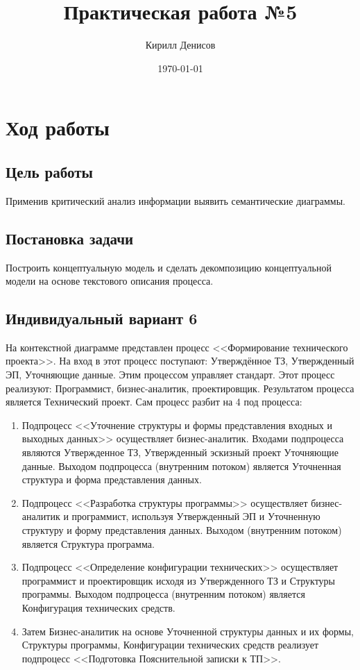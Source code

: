 \documentclass[a4paper,14pt]{extarticle}
\author{Кирилл Денисов}
\title{Практическая работа №5}
\date{\today}
\newcommand{\pathToCommonFolder}{/home/denilai/Documents/repos/latex/Common}
\begin{document}
	\thispagestyle{empty}
	
	\newpage
	\newpage
	\section*{Ход работы}
	
	
	\subsection*{Цель работы}
	Применив критический анализ информации выявить семантические диаграммы.
	
	\subsection*{Постановка задачи}
	Построить концептуальную модель и сделать декомпозицию концептуальной модели на основе текстового описания процесса.

	\subsection*{Индивидуальный вариант 6}
	На контекстной диаграмме представлен процесс <<Формирование технического проекта>>. На вход в этот процесс поступают: Утверждённое ТЗ, Утвержденный ЭП, Уточняющие данные. Этим процессом управляет стандарт. Этот процесс реализуют: Программист, бизнес-аналитик, проектировщик. Результатом процесса является Технический проект.
	Сам процесс разбит на 4 под процесса:
	\begin{enumerate}
	\item Подпроцесс <<Уточнение структуры и формы представления входных и выходных данных>> осуществляет бизнес-аналитик. Входами подпроцесса являются Утвержденное ТЗ, Утвержденный эскизный проект Уточняющие данные. Выходом подпроцесса (внутренним потоком) является Уточненная структура и форма представления данных.
	\item Подпроцесс <<Разработка структуры программы>> осуществляет бизнес-аналитик и программист, используя Утвержденный ЭП и Уточненную структуру и форму представления данных. Выходом (внутренним потоком) является Структура программа.
	\item Подпроцесс <<Определение конфигурации технических>> осуществляет программист и проектировщик исходя из Утвержденного ТЗ и Структуры программы. Выходом подпроцесса (внутренним потоком) является Конфигурация технических средств. 
	\item Затем Бизнес-аналитик на основе Уточненной структуры данных и их формы, Структуры программы, Конфигурации технических средств реализует подпроцесс <<Подготовка Пояснительной записки к ТП>>.
	\end{enumerate}
	
\end{document}
